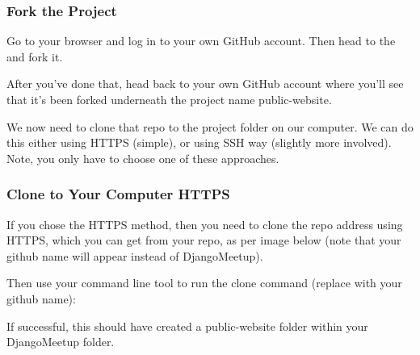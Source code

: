 \documentclass[letterpaper,10pt,english]{sphinxmanual}
\begin{document}
\subsubsection{Fork the Project}
\label{\detokenize{guide/02_download-project:fork-the-project}}
Go to your browser and log in to your own GitHub account.  Then head to the  and fork it.


After you’ve done that, head back to your own GitHub account where you’ll see that it’s been forked underneath the project name public-website.

We now need to clone that repo to the project folder on our computer.   We can do this either using HTTPS (simple), or using SSH way (slightly more involved).  Note, you only have to choose one of these approaches.


\subsubsection{Clone to Your Computer \textendash{} HTTPS}
\label{\detokenize{guide/02_download-project:clone-to-your-computer-https}}
If you chose the HTTPS method, then you need to clone the repo address using HTTPS, which you can get from your repo, as per image below (note that your github name will appear instead of DjangoMeetup).


Then use your command line tool to run the clone command (replace  with your github name):

\begin{sphinxVerbatim}[commandchars=\\\{\}]
  
\end{sphinxVerbatim}

If successful, this should have created a public-website folder within your DjangoMeetup folder.
\end{document}
